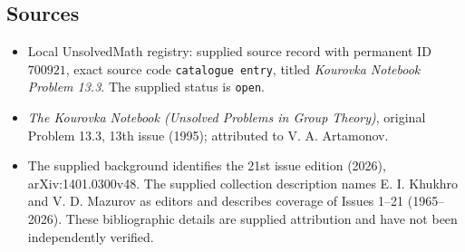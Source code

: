 \documentclass[11pt]{article}
\begin{document}
\subsection{Sources}
\begin{itemize}
\item Local UnsolvedMath registry: supplied source record with permanent ID \(700921\), exact source code \texttt{catalogue entry}, titled \emph{Kourovka Notebook Problem 13.3}. The supplied status is \texttt{open}.
\item \emph{The Kourovka Notebook (Unsolved Problems in Group Theory)}, original Problem 13.3, 13th issue (1995); attributed to V. A. Artamonov.
\item The supplied background identifies the 21st issue edition (2026), arXiv:1401.0300v48. The supplied collection description names E. I. Khukhro and V. D. Mazurov as editors and describes coverage of Issues 1--21 (1965--2026). These bibliographic details are supplied attribution and have not been independently verified.
\end{itemize}
\end{document}
